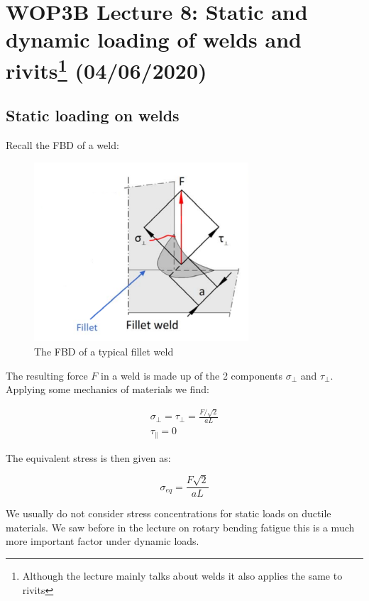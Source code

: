 \documentclass[11pt, a4paper]{article}
\begin{document}
\setcounter{equation}{0}
\setcounter{section}{7}

\section{WOP3B Lecture 8: Static and dynamic loading of welds and rivits\footnote{Although the lecture mainly talks about welds it also applies the same to rivits} (04/06/2020)}


\subsection{Static loading on welds}
Recall the FBD of a weld:

\begin{figure}[H]
  \centerline{\includegraphics[width=80mm]{images/Fillet_weld.png}}
  \caption{The FBD of a typical fillet weld}
\end{figure}

The resulting force $F$ in a weld is made up of the 2 components $\sigma_\perp$ and $\tau_\perp$. Applying some mechanics of materials we find:

\begin{gather}
	\sigma_\perp = \tau_\perp = \frac{F/\sqrt{2}}{aL}\\
	\tau_\parallel = 0
\end{gather}

The equivalent stress is then given as:

\begin{equation}
	\sigma_{eq} = \frac{F\sqrt{2}}{aL}
\end{equation}

We usually do not consider stress concentrations for static loads on ductile materials. We saw before in the lecture on rotary bending fatigue this is a much more important factor under dynamic loads.
\end{document}
